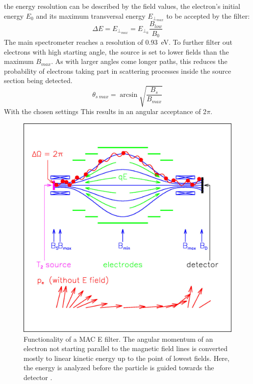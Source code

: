       the energy resolution can be described by the field values, the electron's initial energy $E_0$ and its maximum transversal energy $E_{\bot_{max}}$ to be accepted by the filter:
      \begin{equation}
	    \Delta E = E_{\bot_{max}} = E_{\bot_0}\frac{B_{low}}{B_{0}}
      \end{equation}
      The main spectrometer reaches a resolution of \SI{0.93}{\electronvolt}.
      To further filter out electrons with high starting angle, the source is set to lower fields than the maximum $B_{max}$.
      As with larger angles come longer paths, this reduces the probability of electrons taking part in scattering processes inside the source section being detected.
      \begin{equation}
      	\theta_{s~max}= \arcsin{\sqrt{\frac{B_s}{B_{max}}}}
      \end{equation}
      With the chosen settings This results in an angular acceptance of 2$\pi$.
      
            \begin{figure}
	\centering
      	\includegraphics[width = 0.6 \textwidth]{graphics/katrinExperiment/macEFilter.jpg}
      	\caption[MAC E Filter]{Functionality of a MAC E filter. The angular momentum of an electron not starting parallel to the magnetic field lines is converted mostly to linear kinetic energy up to the point of lowest fields. Here, the energy is analyzed before the particle is guided towards the detector \cite{macEFilter}.}
      	\label{fig:katrinExperiment:macEFilter}
      \end{figure}
      
